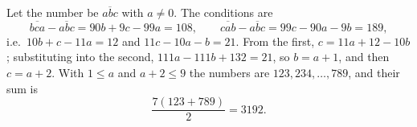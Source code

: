 Let the number be $\overline{abc}$ with $a\ne0$. The conditions are
\[
\overline{bca}-\overline{abc}=90b+9c-99a=108,\qquad \overline{cab}-\overline{abc}=99c-90a-9b=189,
\]
i.e.\ $10b+c-11a=12$ and $11c-10a-b=21$. From the first, $c=11a+12-10b$; substituting into the second, $111a-111b+132=21$, so $b=a+1$, and then $c=a+2$. With $1\le a$ and $a+2\le9$ the numbers are $123,234,\dots,789$, and their sum is
\[
\dfrac{7(123+789)}{2}=\boxed{3192}.
\]
